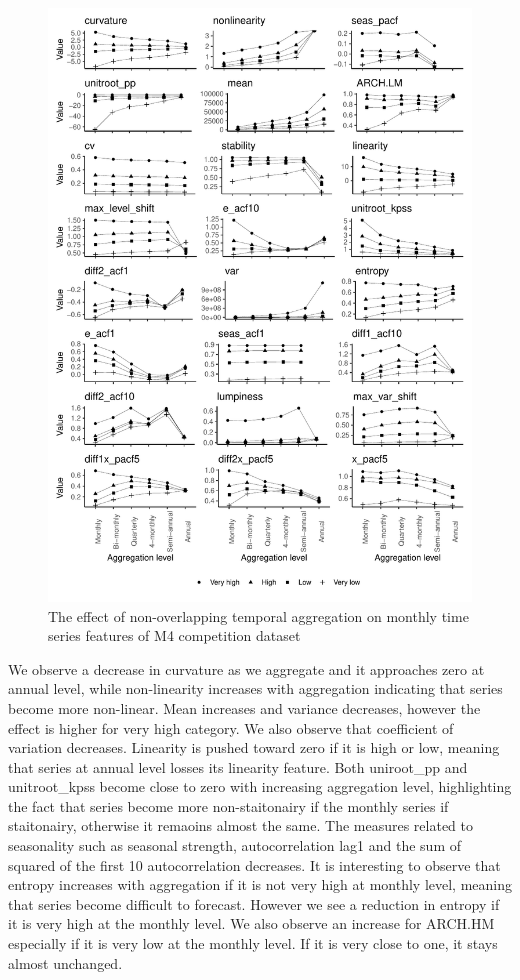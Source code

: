 \documentclass[preprint, 3p,
authoryear]{elsarticle} %
\begin{document}
\begin{figure}[H]

{\centering \includegraphics[width=0.7\linewidth]{img/mp_category_all1} 

}

\caption{The effect of non-overlapping temporal aggregation on monthly time series features of M4 competition dataset}\label{fig:featureagg1}
\end{figure}

We observe a decrease in curvature as we aggregate and it approaches
zero at annual level, while non-linearity increases with aggregation
indicating that series become more non-linear. Mean increases and
variance decreases, however the effect is higher for very high category.
We also observe that coefficient of variation decreases. Linearity is
pushed toward zero if it is high or low, meaning that series at annual
level losses its linearity feature. Both uniroot\_pp and unitroot\_kpss
become close to zero with increasing aggregation level, highlighting the
fact that series become more non-staitonairy if the monthly series if
staitonairy, otherwise it remaoins almost the same. The measures related
to seasonality such as seasonal strength, autocorrelation lag1 and the
sum of squared of the first 10 autocorrelation decreases. It is
interesting to observe that entropy increases with aggregation if it is
not very high at monthly level, meaning that series become difficult to
forecast. However we see a reduction in entropy if it is very high at
the monthly level. We also observe an increase for ARCH.HM especially if
it is very low at the monthly level. If it is very close to one, it
stays almost unchanged.
\end{document}
